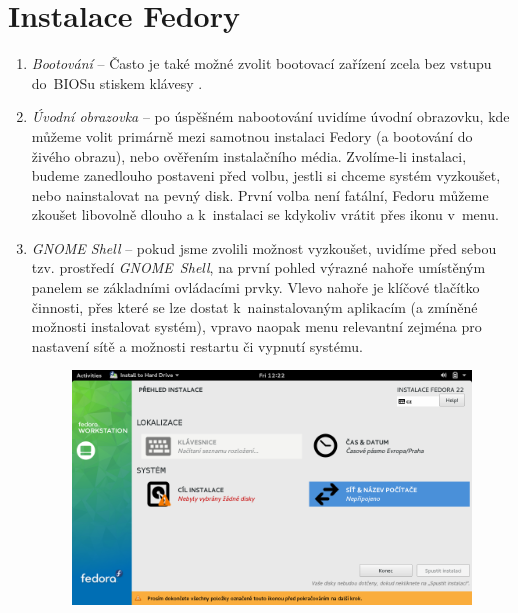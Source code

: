 \section*{Instalace Fedory}
\begin{enumerate}

\item\emph{Bootování} --  Často je také možné zvolit bootovací zařízení zcela bez vstupu do~BIOSu stiskem klávesy .

\item\emph{Úvodní obrazovka} -- po úspěšném nabootování uvidíme úvodní obrazovku, kde můžeme volit primárně mezi samotnou instalaci Fedory (a bootování do živého obrazu), nebo ověřením instalačního média. Zvolíme-li instalaci, budeme zanedlouho postaveni před volbu, jestli si chceme systém vyzkoušet, nebo nainstalovat na pevný disk. První volba není fatální, Fedoru můžeme zkoušet libovolně dlouho a k~instalaci se kdykoliv vrátit přes ikonu v~menu.

\item\emph{GNOME Shell} -- pokud jsme zvolili možnost vyzkoušet, uvidíme před sebou tzv. prostředí \emph{GNOME~Shell}, na první pohled výrazné nahoře umístěným panelem se základními ovládacími prvky. Vlevo nahoře je klíčové tlačítko činnosti, přes které se lze dostat k~nainstalovaným aplikacím (a zmíněné možnosti instalovat systém), vpravo naopak menu relevantní zejména pro nastavení sítě a možnosti restartu či vypnutí systému. %

\begin{figure}[t]
\begin{center}
\includegraphics[width=\textwidth]{img/instalator-b}
 \label{fig:instalator-b}
\end{center}
\end{figure}


\end{enumerate}
